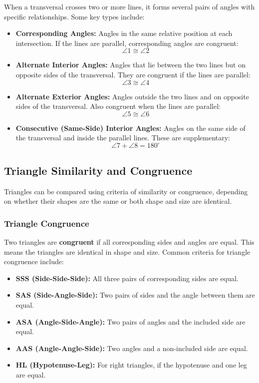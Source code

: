 When a transversal crosses two or more lines, it forms several pairs of angles with specific relationships. Some key types include:

\begin{itemize}[label=\(-\)]
    \item \textbf{Corresponding Angles:} Angles in the same relative position at each intersection. If the lines are parallel, corresponding angles are congruent:
    \[
    \angle 1 \cong \angle 2
    \]
    
    \item \textbf{Alternate Interior Angles:} Angles that lie between the two lines but on opposite sides of the transversal. They are congruent if the lines are parallel:
    \[
    \angle 3 \cong \angle 4
    \]
    
    \item \textbf{Alternate Exterior Angles:} Angles outside the two lines and on opposite sides of the transversal. Also congruent when the lines are parallel:
    \[
    \angle 5 \cong \angle 6
    \]
    
    \item \textbf{Consecutive (Same-Side) Interior Angles:} Angles on the same side of the transversal and inside the parallel lines. These are supplementary:
    \[
    \angle 7 + \angle 8 = 180^\circ
    \]
\end{itemize}

\subsection{Triangle Similarity and Congruence}
Triangles can be compared using criteria of similarity or congruence, depending on whether their shapes are the same or both shape and size are identical.

\subsubsection{Triangle Congruence}
Two triangles are \textbf{congruent} if all corresponding sides and angles are equal. This means the triangles are identical in shape and size. Common criteria for triangle congruence include:

\begin{itemize}[label=\(-\)]
    \item \textbf{SSS (Side-Side-Side):} All three pairs of corresponding sides are equal.
    \item \textbf{SAS (Side-Angle-Side):} Two pairs of sides and the angle between them are equal.
    \item \textbf{ASA (Angle-Side-Angle):} Two pairs of angles and the included side are equal.
    \item \textbf{AAS (Angle-Angle-Side):} Two angles and a non-included side are equal.
    \item \textbf{HL (Hypotenuse-Leg):} For right triangles, if the hypotenuse and one leg are equal.
\end{itemize}

